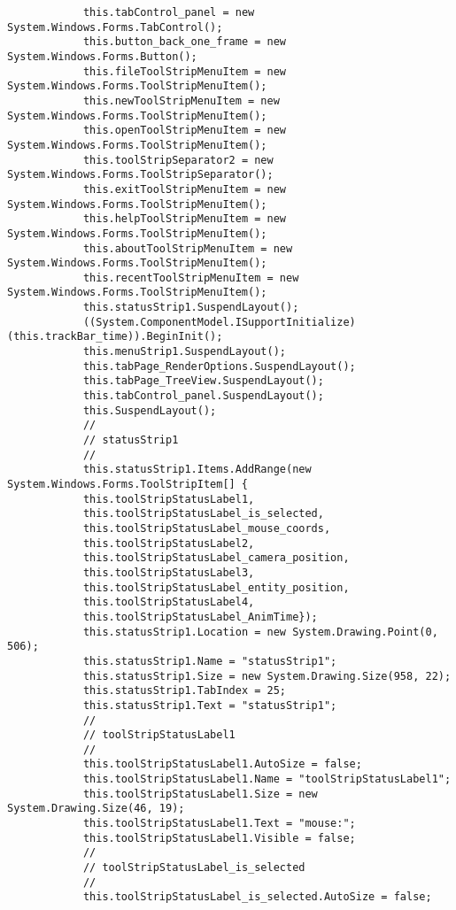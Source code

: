\begin{scriptsize}
\begin{verbatim}
            this.tabControl_panel = new System.Windows.Forms.TabControl();
            this.button_back_one_frame = new System.Windows.Forms.Button();
            this.fileToolStripMenuItem = new System.Windows.Forms.ToolStripMenuItem();
            this.newToolStripMenuItem = new System.Windows.Forms.ToolStripMenuItem();
            this.openToolStripMenuItem = new System.Windows.Forms.ToolStripMenuItem();
            this.toolStripSeparator2 = new System.Windows.Forms.ToolStripSeparator();
            this.exitToolStripMenuItem = new System.Windows.Forms.ToolStripMenuItem();
            this.helpToolStripMenuItem = new System.Windows.Forms.ToolStripMenuItem();
            this.aboutToolStripMenuItem = new System.Windows.Forms.ToolStripMenuItem();
            this.recentToolStripMenuItem = new System.Windows.Forms.ToolStripMenuItem();
            this.statusStrip1.SuspendLayout();
            ((System.ComponentModel.ISupportInitialize)(this.trackBar_time)).BeginInit();
            this.menuStrip1.SuspendLayout();
            this.tabPage_RenderOptions.SuspendLayout();
            this.tabPage_TreeView.SuspendLayout();
            this.tabControl_panel.SuspendLayout();
            this.SuspendLayout();
            // 
            // statusStrip1
            // 
            this.statusStrip1.Items.AddRange(new System.Windows.Forms.ToolStripItem[] {
            this.toolStripStatusLabel1,
            this.toolStripStatusLabel_is_selected,
            this.toolStripStatusLabel_mouse_coords,
            this.toolStripStatusLabel2,
            this.toolStripStatusLabel_camera_position,
            this.toolStripStatusLabel3,
            this.toolStripStatusLabel_entity_position,
            this.toolStripStatusLabel4,
            this.toolStripStatusLabel_AnimTime});
            this.statusStrip1.Location = new System.Drawing.Point(0, 506);
            this.statusStrip1.Name = "statusStrip1";
            this.statusStrip1.Size = new System.Drawing.Size(958, 22);
            this.statusStrip1.TabIndex = 25;
            this.statusStrip1.Text = "statusStrip1";
            // 
            // toolStripStatusLabel1
            // 
            this.toolStripStatusLabel1.AutoSize = false;
            this.toolStripStatusLabel1.Name = "toolStripStatusLabel1";
            this.toolStripStatusLabel1.Size = new System.Drawing.Size(46, 19);
            this.toolStripStatusLabel1.Text = "mouse:";
            this.toolStripStatusLabel1.Visible = false;
            // 
            // toolStripStatusLabel_is_selected
            // 
            this.toolStripStatusLabel_is_selected.AutoSize = false;

\end{verbatim}
\end{scriptsize}
